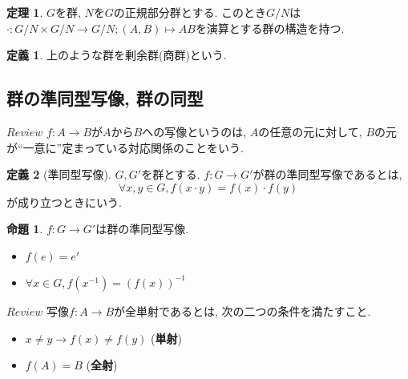 \documentclass[a4j,dvipdfmx]{jsarticle}
\theoremstyle{definition}
\newtheorem{definition}{定義}
\theoremstyle{definition}
\newtheorem{theorem}{定理}
\theoremstyle{definition}
\newtheorem{proposition}{命題}
\begin{document}
            \begin{theorem}
                $G$を群, $N$を$G$の正規部分群とする. このとき$G/N$は$\cdot:G/N\times G/N\rightarrow G/N;(A,B)\mapsto AB$を演算とする群の構造を持つ.
            \end{theorem}

            \begin{definition}
                上のような群を剰余群(商群)という.
            \end{definition}

        \subsection*{群の準同型写像, 群の同型}
            \begin{itembox}[l]{$Review$}
                $f:A\to B$が$A$から$B$への写像というのは, $A$の任意の元に対して, $B$の元が``一意に''定まっている対応関係のことをいう.
            \end{itembox}

            \begin{definition}[準同型写像]
                $G,G'$を群とする. $f:G\to G'$が群の準同型写像であるとは, 
                \begin{equation}
                    \forall x,y\in G,f(x\cdot y)=f(x)\cdot f(y)
                \end{equation}
                が成り立つときにいう.
            \end{definition}

            \begin{proposition}
                $f:G\to G'$は群の準同型写像.
                \begin{itemize}
                    \item $f(e)=e'$
                    \item $\forall x\in G,f(x^{-1})=(f(x))^{-1}$
                \end{itemize}
            \end{proposition}

            \begin{itembox}[l]{$Review$}
                写像$f:A\to B$が全単射であるとは, 次の二つの条件を満たすこと.
                \begin{itemize}
                    \item $x\neq y\rightarrow f(x)\neq f(y)$ (\textbf{単射})
                    \item $f(A)=B$ (\textbf{全射})
                \end{itemize}
            \end{itembox}
\end{document}
